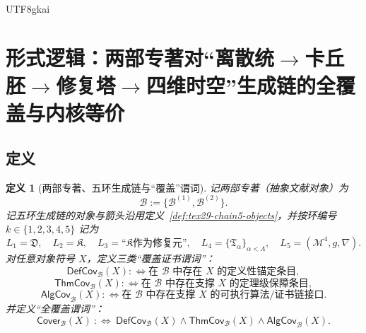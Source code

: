 \documentclass[12pt]{article}
\newtheorem{definition}{定义}[section]
\begin{document}
\begin{CJK*}{UTF8}{gkai}
\section{\texorpdfstring{形式逻辑：两部专著对“离散统$\to$卡丘胚$\to$修复塔$\to$四维时空”生成链的全覆盖与内核等价}{形式逻辑：两部专著对离散统->卡丘胚->修复塔->四维时空生成链的全覆盖与内核等价}
  }
\label{sec:tex29-books-cover-chain}

\subsection{定义}
\label{subsec:tex29-books-cover-chain-def}

\begin{definition}[两部专著、五环生成链与“覆盖”谓词]
\label{def:tex29-books-cover-chain}
记两部专著（抽象文献对象）为
\[
  \mathcal{B}:=\{\mathcal{B}^{(1)},\mathcal{B}^{(2)}\}.
\]
记五环生成链的对象与箭头沿用定义~\ref{def:tex29-chain5-objects}，并按环编号 $k\in\{1,2,3,4,5\}$ 记为
\[
  L_1=\mathfrak{D},\quad L_2=\mathfrak{K},\quad L_3=\text{“}\mathfrak{K}\text{作为修复元”},\quad
  L_4=\{\mathfrak{T}_{\alpha}\}_{\alpha<\Lambda},\quad L_5=(\mathcal{M}^{4},g,\nabla).
\]
对任意对象符号 $X$，定义三类“覆盖证书谓词”：
\[
  \mathsf{DefCov}_{\mathcal{B}}(X):\Longleftrightarrow \text{在 }\mathcal{B}\text{ 中存在 }X\text{ 的定义性锚定条目},
\]
\[
  \mathsf{ThmCov}_{\mathcal{B}}(X):\Longleftrightarrow \text{在 }\mathcal{B}\text{ 中存在支撑 }X\text{ 的定理级保障条目},
\]
\[
  \mathsf{AlgCov}_{\mathcal{B}}(X):\Longleftrightarrow \text{在 }\mathcal{B}\text{ 中存在支撑 }X\text{ 的可执行算法/证书链接口}.
\]
并定义“全覆盖谓词”：
\[
  \mathsf{Cover}_{\mathcal{B}}(X)\ :\Longleftrightarrow\
  \mathsf{DefCov}_{\mathcal{B}}(X)\wedge \mathsf{ThmCov}_{\mathcal{B}}(X)\wedge \mathsf{AlgCov}_{\mathcal{B}}(X).
\]
\end{definition}


\end{CJK*}
\end{document}
